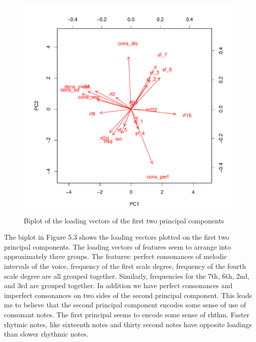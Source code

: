 \documentclass[12pt,twoside]{reedthesis}
\theoremstyle{definition}
\theoremstyle{definition}
\theoremstyle{definition}
\theoremstyle{remark}
\begin{document}
\begin{figure}[H]
\centering
\includegraphics[scale = .5]{images/biplot_b.pdf}
\caption{Biplot of the loading vectors of the first two principal components}
\label{subd}
\end{figure}
The biplot in Figure 5.3 shows the loading vectors plotted on the first
two principal components. The loading vectors of features seem to
arrange into approximately three groups. The features: perfect
consonances of melodic intervals of the voice, frequency of the first
scale degree, frequency of the fourth scale degree are all grouped
together. Similarly, frequencies for the 7th, 6th, 2nd, and 3rd are
grouped together. In addition we have perfect consonances and imperfect
consonances on two sides of the second principal component. This leads
me to believe that the second principal component encodes some sense of
use of consonant notes. The first principal seems to encode some sense
of rhthm. Faster rhytmic notes, like sixteenth notes and thirty second
notes have opposite loadings than slower rhythmic notes.
\end{document}
